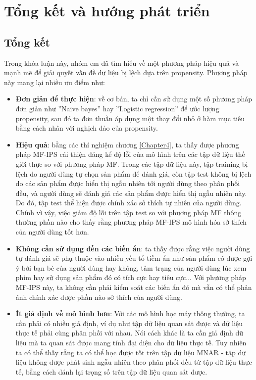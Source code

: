 \chapter{Tổng kết và hướng phát triển}
\label{Chapter5}

\section{Tổng kết}

Trong khóa luận này, nhóm em đã tìm hiểu về một phương pháp hiệu quả và mạnh mẽ để giải quyết vấn đề dữ liệu bị lệch dựa trên propensity. Phương pháp này mang lại nhiều ưu điểm như:
\begin{itemize}
    \item \textbf{Đơn giản để thực hiện}: về cơ bản, ta chỉ cần sử dụng một số phương pháp đơn giản như ''Naive bayes'' hay ''Logistic regression'' để ước lượng propensity, sau đó ta đơn thuần áp dụng một thay đổi nhỏ ở hàm mục tiêu bằng cách nhân với nghịch đảo của propensity.
    \item \textbf{Hiệu quả}: bằng các thí nghiệm chương \ref{Chapter4}, ta thấy được phương pháp MF-IPS cải thiện đáng kể độ lỗi của mô hình trên các tập dữ liệu thế giới thực so với phương pháp MF. Trong các tập dữ liệu này, tập training bị lệch do người dùng tự chọn sản phẩm để đánh giá, còn tập test không bị lệch do các sản phẩm được hiển thị ngẫu nhiên tới người dùng theo phân phối đều, và người dùng sẽ đánh giá các sản phẩm được hiển thị ngẫu nhiên này. Do đó, tập test thể hiện được chính xác sở thích tự nhiên của người dùng. Chính vì vậy, việc giảm độ lỗi trên tập test so với phương pháp MF thông thường phần nào cho thấy rằng phương pháp MF-IPS mô hình hóa sở thích của người dùng tốt hơn.
    \item \textbf{Không cần sử dụng đến các biến ẩn}: ta thấy được rằng việc người dùng tự đánh giá sẽ phụ thuộc vào nhiều yếu tố tiềm ẩn như sản phẩm có được gợi ý bởi bạn bè của người dùng hay không, tâm trạng của người dùng lúc xem phim hay sử dụng sản phẩm đó có tích cực hay tiêu  cực... Với phương pháp MF-IPS này, ta không cần phải kiểm soát các biến ẩn đó mà vẫn có thể phản ánh chính xác được phần nào sở thích của người dùng.
    \item \textbf{Ít giả định về mô hình hơn}: Với các mô hình học máy thông thường, ta cần phải có nhiều giả định, ví dụ như tập dữ liệu quan sát được và dữ liệu thực tế phải cùng phân phối với nhau. Nói cách khác là ta cần giả định dữ liệu mà ta quan sát được mang tính đại diện cho dữ liệu thực tế. Tuy nhiên ta có thể thấy rằng ta có thể học được tốt trên tập dữ liệu MNAR - tập dữ liệu không được phát sinh ngẫu nhiên theo phân phối đều từ tập dữ liệu thực tế, bằng cách đánh lại trọng số trên tập dữ liệu quan sát được. 
\end{itemize}

